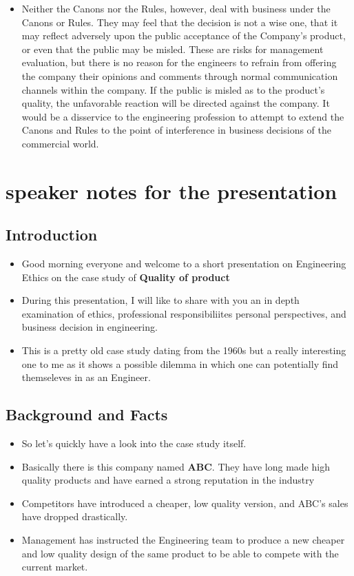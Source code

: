 \documentclass[11pt, a4paper]{article}
\begin{document}
\begin{itemize}
  \item Neither the Canons nor the Rules, however, deal with business under the Canons or Rules.
        They may feel that the decision is not a wise one, that it may reflect adversely upon the
        public acceptance of the Company's product, or even that the public may be misled. These
        are risks for management evaluation, but there is no reason for the engineers to refrain
        from offering the company their opinions and comments through normal communication
        channels within the company. If the public is misled as to the product's quality, the
        unfavorable reaction will be directed against the company. It would be a disservice to the
        engineering profession to attempt to extend the Canons and Rules to the point of
        interference in business decisions of the commercial world.
\end{itemize}

\section{speaker notes for the presentation}
\subsection{Introduction}
\begin{itemize}
  \item Good morning everyone and welcome to a short presentation on Engineering Ethics on the case
        study of  \textbf{Quality of product}
  \item During this presentation, I will like to share with you an in depth examination of ethics,
        professional responsibiliites
        personal perspectives, and business decision  in engineering.
  \item This is a pretty old case study dating from the 1960s but a really interesting one to me as it
        shows a possible dilemma in which one can potentially find themseleves in as an Engineer.
\end{itemize}

\subsection{Background and Facts}
\begin{itemize}
  \item So let's quickly have a look into the case study itself.

  \item Basically there is this company named  \textbf{ABC}. They have long made high quality products
        and have earned a strong reputation in the industry

  \item Competitors have  introduced a cheaper, low quality version, and ABC's sales have dropped
        drastically.

  \item Management has instructed the Engineering team to produce a new cheaper and low quality design
        of the same product to be able to compete with the current market.

\end{itemize}
\end{document}

